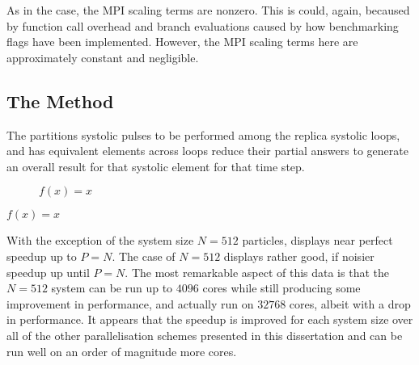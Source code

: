As in the \systolicloop{} case, the MPI scaling terms are nonzero.
%
This is could, again, becaused by function call overhead and
branch evaluations caused by how benchmarking flags have been implemented.
%
However, the MPI scaling terms here are approximately constant and negligible.


\subsection{The \pairoperation{} Method}

The \pairoperation{} partitions systolic pulses to be performed among
the replica systolic loops, and has equivalent elements across loops
reduce their partial answers to generate an overall result for that
systolic element for that time step.

%
%
\begin{figure}[!h]
    
    \caption{
        \vZeroSpeedupCaption
            {\replicatedsystolicloop{}}
            {\pairoperation{}}
            {$f(x) = x$}
    }
    \label{fig:v1_replicated_systolic_pair_operation_speedups}
\end{figure}


\vZeroSpeedupExplanation
    {}
    {\replicatedsystolicloop{}}
    {\pairoperation{}}
    {$f(x) = x$}


%
With the exception of the system size $N = 512$ particles,
displays near perfect speedup up to $P = N$.
%
The case of $N = 512$ displays rather good, if noisier speedup up
until $P = N$.
%
The most remarkable aspect of this data is that the $N = 512$ system can
be run up to $4096$ cores while still producing some
improvement in performance,
and actually run on $32768$ cores, albeit with a drop
in performance.
%
It appears that the speedup is improved for each system size over all of
the other parallelisation schemes presented in this dissertation
and can be run well on an order of magnitude more cores.

